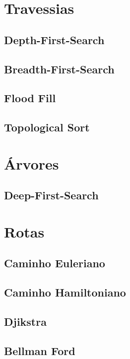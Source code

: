     \section{Travessias}
        \subsection*{Depth-First-Search}
            
        \subsection*{Breadth-First-Search}
            
        \subsection*{Flood Fill}
            
        \subsection*{Topological Sort}
            
        \newpage
    \section{Árvores}
        \subsection*{Deep-First-Search}
            
        
        \newpage
    \section{Rotas}
        \subsection{Caminho Euleriano}
            
        \subsection{Caminho Hamiltoniano}
            
        \subsection{Djikstra}
            
        \subsection{Bellman Ford}
            
        \newpage
